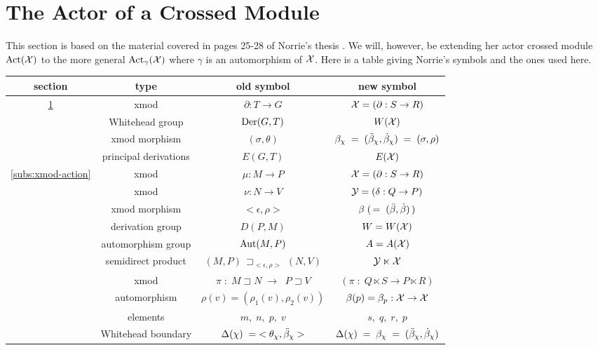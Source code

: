 
\section{The Actor of a Crossed Module} \label{sect:actor}

This section is based on the material covered in pages 25-28 
of Norrie's thesis \cite{nor2}. 
We will, however, be extending her actor crossed module $\mathrm{Act}(\mathcal{X})$ 
to the more general $\mathrm{Act}_{\gamma}(\mathcal{X})$ where $\gamma$ 
is an automorphism of $\mathcal{X}$. 
Here is a table giving Norrie's symbols and the ones used here.

\vspace{5mm}
\begin{center}
\begin{tabular}{|c|c|c|c|}
\hline
  section  &  type  &  old symbol  &  new symbol  \\
\hline
\ref{sect:actor}
 &  xmod &   $\partial : T \to G$  & $\mathcal{X} = (\partial : S \to R)$   \\
 &  Whitehead group  &  $\mathrm{Der}(G,T)$  &  $W(\mathcal{X})$  \\
 &  xmod morphism    &  $(\sigma,\theta)$  & 
      $\beta_{\chi} \;=\; (\ddot{\beta}_{\chi},\dot{\beta}_{\chi}) \;=\; (\sigma,\rho)$  \\
 & principal derivations  &  $E(G,T)$  &  $E(\mathcal{X})$  \\
\hline
\ref{subs:xmod-action}
 &  xmod &   $\mu : M \to P$    &   $\mathcal{X} = (\partial : S \to R)$    \\
 &  xmod &   $\nu : N \to V$    &   $\mathcal{Y} = (\delta : Q \to P)$    \\
 &  xmod morphism & $<\epsilon,\rho>$  &
                  $\beta\;(\,=\;(\ddot{\beta},\dot{\beta})\,)$ \\
 &  derivation group &   $D(P,M)$           &   $W = W(\mathcal{X})$  \\
 &  automorphism group &   $\mathrm{Aut}(M,P)$        &   $A = A(\mathcal{X})$  \\
 &  semidirect product &   $(M,P)\,\sqsupset_{<\epsilon,\rho>}\,(N,V)$  &  
                  $\mathcal{Y} \ltimes \mathcal{X}$  \\
 &  xmod &   $\pi \;:\; M \sqsupset N \;\to\; \;P \sqsupset V$  &
                  $(\pi \;:\; Q \ltimes S \to P \ltimes R)$      \\
 &  automorphism &   $\rho(v) = (\rho_1(v),\rho_2(v))$  &  
                  $\beta(p) = \beta_p : \mathcal{X} \to \mathcal{X}$ \\
 &  elements &   $m,\;n,\;p,\;v$    &    $s,\;q,\;r,\;p$  \\
 &  Whitehead boundary &   $\Delta(\chi) \;=\; <\theta_{\chi},\ddot{\beta}_{\chi}>$ &
         $\Delta(\chi) \;=\; \beta_{\chi} \;=\; (\ddot{\beta}_{\chi},\dot{\beta}_{\chi})$  \\
\hline
\end{tabular}
\end{center}


